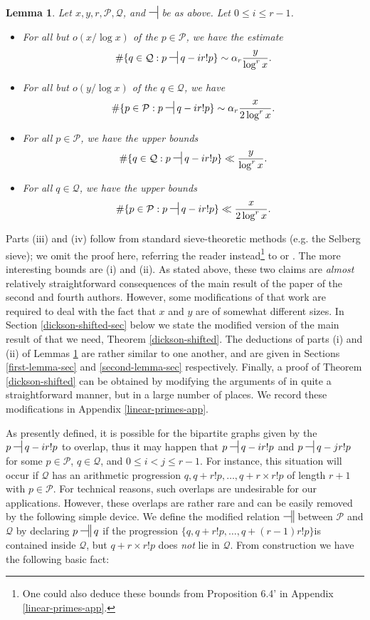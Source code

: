 \documentclass[12pt]{amsart}
\numberwithin{equation}{section}  %
\theoremstyle{remark}
\theoremstyle{plain}
\newtheorem{lem}{Lemma}[section]
\numberwithin{equation}{section}
\renewcommand{\leq}{\leqslant}
\renewcommand{\(}{\left(}
\renewcommand{\)}{\right)}
\newcommand{\asym}{\sim}   %
\newcommand{\rel}{\nsststile{}{}}  %
\newcommand{\relr}{\nsdtstile{}{}} %
\newcommand{\PP}{\mathcal{P}}
\newcommand{\QQ}{\mathcal{Q}}
\begin{document}
\begin{lem}\label{first}  Let $x,y,r,\PP,\QQ$, and $\rel$ be as above.   Let $0 \leq i \leq r-1$.
\begin{itemize}
\item[(i)] For all but $o(x/\log x)$ of the $p \in \PP$, we have the estimate
\[ \# \{ q \in \QQ: p \rel q-ir!p \} \asym  \alpha_r \frac{y}{\log^r x}.\]
\item[(ii)] For all but $o(y/\log x)$ of the $q \in \QQ$, we have
\[ \# \{ p \in \PP : p \rel q-ir!p \} \asym  \alpha_r  \frac{x}{2\log^r x}.\]
\item[(iii)]  For \emph{all} $p \in \PP$, we have the upper bounds
\[ \# \{ q \in \QQ: p \rel q-ir!p \} \ll \frac{y}{\log^r x}.\]
\item[(iv)]  For \emph{all} $q \in \QQ$, we have the upper bounds
\[ \# \{ p \in \PP : p \rel q-ir!p \} \ll \frac{x}{2\log^r x}.\]
\end{itemize}
\end{lem}

Parts (iii) and (iv) follow from standard sieve-theoretic methods (e.g. the Selberg sieve); we omit the proof here, referring the reader instead\footnote{One could also deduce these bounds from Proposition 6.4' in Appendix \ref{linear-primes-app}.} to \cite{HR} or \cite{FI}.  The more interesting bounds are (i) and (ii).
As stated above, these two claims are \emph{almost} relatively straightforward consequences of the main result of the paper \cite{gt-linearprimes} of the second and fourth authors. However, some modifications of that work are required to deal with the fact that $x$ and $y$ are of somewhat different sizes. In Section \ref{dickson-shifted-sec} below we state the modified version of the main result of \cite{gt-linearprimes} that we need, Theorem \ref{dickson-shifted}. The deductions of parts (i) and (ii) of Lemmas \ref{first} are
 rather similar to one another, and are given in Sections \ref{first-lemma-sec} and \ref{second-lemma-sec} respectively. Finally, a proof of Theorem \ref{dickson-shifted} can be obtained by modifying the arguments of \cite{gt-linearprimes} in quite a straightforward manner, but in a large number of places. We record these modifications in Appendix  \ref{linear-primes-app}.

As presently defined, it is possible for the bipartite graphs given by the $p \rel q-ir!p$ to overlap, thus it may happen that $p \rel q-ir!p$ and $p \rel q-jr!p$ for some $p \in \PP$, $q \in \QQ$, and $0 \leq i < j \leq r-1$.  For instance, this situation will occur if $\QQ$ has an arithmetic progression $q,q+r!p,\dots,q+r \times r!p$ of length $r+1$ with $p \in \PP$.  For technical reasons, such overlaps are undesirable for our applications.  However, these overlaps are rather rare and can be easily removed by the following simple device.  We define the modified relation $\relr$ between $\PP$ and $\QQ$ by declaring $p \relr q$ if the progression $\{q, q+r!p,\dots,q+(r-1)r!p\}$is contained inside $\QQ$, but $q+r \times r! p$ does \emph{not} lie in $\QQ$.  From construction we have the following basic fact:
\end{document}
